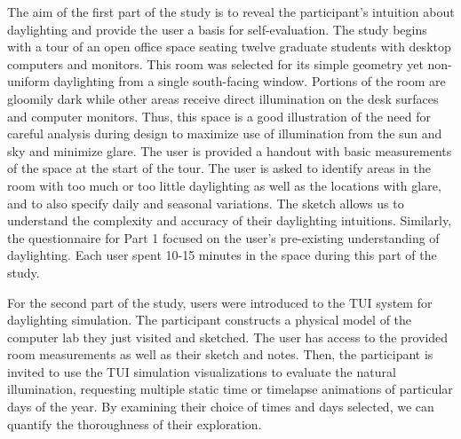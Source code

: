 \documentclass{article}
\begin{document}
The aim of the first part of the study is to reveal the participant's
intuition about daylighting and provide the user a basis for
self-evaluation.  The study begins with a tour of an open office space
seating twelve graduate students with desktop computers and monitors.
This room was selected for its simple geometry yet non-uniform
daylighting from a single south-facing window.  Portions of the room
are gloomily dark while other areas receive direct illumination on the
desk surfaces and computer monitors.  Thus, this space is a good
illustration of the need for careful analysis during design to
maximize use of illumination from the sun and sky and minimize glare.
The user is provided a handout with basic measurements of the space at
the start of the tour.
%
The user is asked to identify areas in the room with too much or too
little daylighting as well as the locations with glare, and to also
specify daily and seasonal variations. 
The
sketch allows us to understand the complexity and accuracy of their
daylighting intuitions.  Similarly, the questionnaire for Part 1
focused on the user's pre-existing understanding of daylighting. 
%
Each user spent 10-15 minutes in the space during this part of the
study.  



For the second part of the study, users were introduced to the TUI
system for daylighting simulation.  The participant constructs a
physical model of the computer lab they just visited and sketched.
The user has access to the provided room measurements as well as their
sketch and notes.  Then, the participant is invited to use the TUI
simulation visualizations to evaluate the natural illumination,
requesting multiple static time or timelapse animations of particular
days of the year.  By examining their choice of times and days
selected, we can quantify the thoroughness of their exploration.
\end{document}
